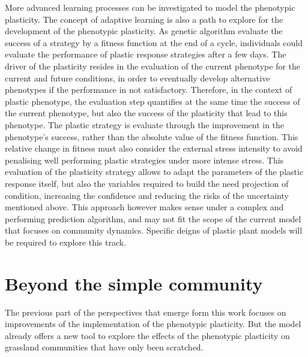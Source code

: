 More advanced learning processes can be investigated to model the phenotypic plasticity. The concept of adaptive learning is also a path to explore for the development of the phenotypic plasticity. As genetic algorithm evaluate the success of a strategy by a fitness function at the end of a cycle, individuals could evaluate the performance of plastic response strategies after a few days. The driver of the plasticity resides in the evaluation of the current phenotype for the current and future conditions, in order to eventually develop alternative phenotypes if the performance in not satisfactory. Therefore, in the context of plastic phenotype, the evaluation step quantifies at the same time the success of the current phenotype, but also the success of the plasticity that lead to this phenotype. The plastic strategy is evaluate through the improvement in the phenotype's success, rather than the absolute value of the fitness function. This relative change in fitness must also consider the external stress intensity to avoid penalising well performing plastic strategies under more intense stress. This evaluation of the plasticity strategy allows to adapt the parameters of the plastic response itself, but also the variables required to build the need projection of condition, increasing the confidence and reducing the risks of the uncertainty mentioned above. This approach however makes sense under a complex and performing prediction algorithm, and may not fit the scope of the current model that focuses on community dynamics. Specific deigns of plastic plant models will be required to explore this track.





\section{Beyond the simple community}

The previous part of the perspectives that emerge form this work focuses on improvements of the implementation of the phenotypic plasticity. But the model already offers a new tool to explore the effects of the phenotypic plasticity on grassland communities that have only been scratched.

